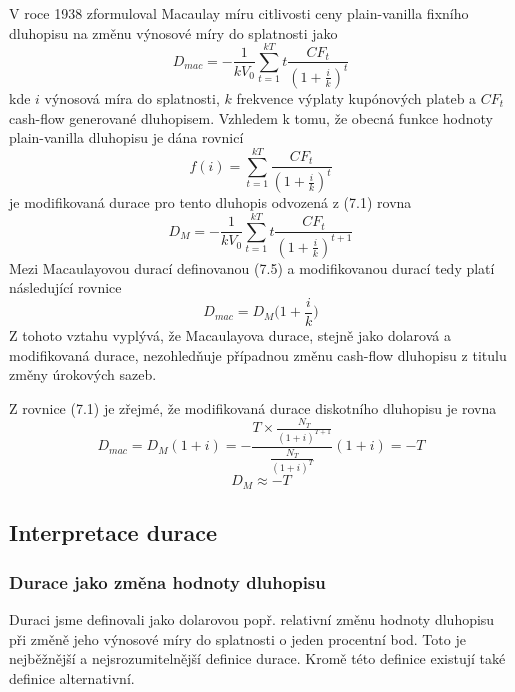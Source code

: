 \documentclass[a4paper]{book}
\begin{document}
V roce 1938 zformuloval Macaulay míru citlivosti ceny plain-vanilla fixního dluhopisu na změnu výnosové míry do splatnosti jako
\begin{equation}
D_{mac} = -\frac{1}{kV_0}\sum_{t=1}^{kT} t\frac{CF_t}{(1 + \frac{i}{k})^t}
\end{equation}
kde $i$ výnosová míra do splatnosti, $k$ frekvence výplaty kupónových plateb a $CF_t$ cash-flow generované dluhopisem. 
Vzhledem k tomu, že obecná funkce hodnoty plain-vanilla dluhopisu je dána rovnicí
\begin{equation*}
f(i) = \sum_{t = 1}^{kT} \frac{CF_t}{(1+\frac{i}{k})^t}
\end{equation*}
je modifikovaná durace pro tento dluhopis odvozená z (7.1) rovna
\begin{equation*}
D_M = -\frac{1}{k V_0}\sum_{t = 1}^{kT} t \frac{CF_t}{(1 + \frac{i}{k})^{t+1}}
\end{equation*}
Mezi Macaulayovou durací definovanou (7.5) a modifikovanou durací tedy platí následující rovnice
\begin{equation*}
D_{mac} = D_M \Big( 1 + \frac{i}{k} \Big) 
\end{equation*}
Z tohoto vztahu vyplývá, že Macaulayova durace, stejně jako dolarová a modifikovaná durace, nezohledňuje případnou změnu cash-flow dluhopisu z titulu změny úrokových sazeb.

Z rovnice (7.1) je zřejmé, že modifikovaná durace diskotního dluhopisu je rovna
\begin{equation*}
D_{mac} = D_M (1 + i) = -\frac{T \times \frac{N_T}{(1 + i)^{T+1}}}{\frac{N_T}{(1 + i)^T}}(1+i) = -T
\end{equation*}
\begin{equation*}
D_M \approx -T
\end{equation*}

\subsection{Interpretace durace}

\subsubsection{Durace jako změna hodnoty dluhopisu}

Duraci jsme definovali jako dolarovou popř. relativní změnu hodnoty dluhopisu při změně jeho výnosové míry do splatnosti o jeden procentní bod. Toto je nejběžnější a nejsrozumitelnější definice durace. Kromě této definice existují také definice alternativní.
\end{document}
